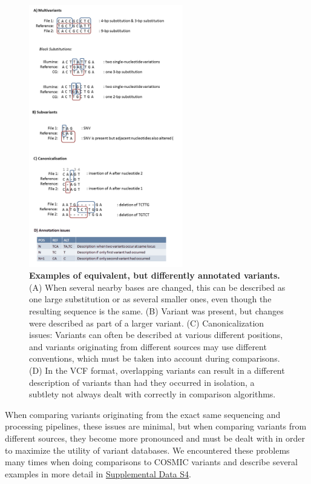 \begin{figure}[t!]
\centering
\includegraphics[width=0.6\textwidth]{chapters/images/virtualnormal/Hiltemann_Figure5.png}
\caption{\textbf{Examples of equivalent, but differently annotated variants.} (A) When several nearby bases are changed, this can be described as one large substitution or as several smaller ones, even though the resulting sequence is the same. (B) Variant was present, but changes were described as part of a larger variant. (C) Canonicalization issues: Variants can often be described at various different positions, and variants originating from different sources may use different conventions, which must be taken into account during comparisons. (D) In the VCF format, overlapping variants can result in a different description of variants than had they occurred in isolation, a subtlety not always dealt with correctly in comparison algorithms. }
\label{fig:variantannotation}
\end{figure}

When comparing variants originating from the exact same sequencing and processing pipelines, these issues are minimal, but when comparing variants from different sources, they become more pronounced and must be dealt with in order to maximize the utility of variant databases. We encountered these problems many times when doing comparisons to COSMIC variants and describe several examples in more detail in \href{https://genome.cshlp.org/content/25/9/1382/suppl/DC1}{Supplemental Data S4}.

